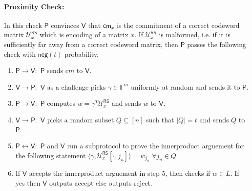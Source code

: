 \documentclass[runningheads]{llncs}
\newcommand{\innp}[2]{\langle #1,#2\rangle}
\def\prover{\mathsf{P}}
\def\verifier{\mathsf{V}}
\def\RS{\mathsf{RS}} %
\def\cm{\mathsf{cm}} %
\def\negl{\mathsf{neg}}
\def\calU{\mathcal{U}}
\def\bbF{\mathbb{F}}
\begin{document}
\paragraph{\textbf{Proximity Check:}} In this check $\prover$ convinces $\verifier$ that $\cm_x$ is the commitment of a correct codeword matrix $\calU^{\RS}_x$ which is encoding of a matrix $x$. If $\calU^{\RS}_x$ is malformed, i.e. if it is sufficiently far away from a correct codeword matrix, then $\prover$ passes the following check with $\negl(t)$ probability.
	\begin{enumerate}
		\item $\prover \rightarrow \verifier :$ $\prover$ sends $cm$ to $\verifier$.
		\item $\verifier \rightarrow \prover :$ $\verifier$ as a challenge picks $\gamma \in \bbF^m$ uniformly at random and sends it to $\prover$.
		\item $\prover \rightarrow \verifier :$ $\prover$ computes $w=\gamma^T\calU^{\RS}_x$ and sends $w$ to $\verifier$.
		\item $\verifier \rightarrow \prover :$ $\verifier$ picks a random subset $Q\subseteq [n]$ such that $|Q|=t$ and sends $Q$ to $\prover$.
		\item $\prover \leftrightarrow \verifier: $ $\prover$ and $\verifier$ run a subprotocol to prove the innerproduct arguement for the following statement $\innp{\gamma}{\calU^{\RS}_x[\cdot,j_u]}=w_{j_u}$ $\forall j_u\in Q$
		\item If $\verifier$ accepts the innerproduct arguement in step 5, then checks if $w\in L$. If yes then $\verifier$ outputs accept else outputs reject.
	\end{enumerate}
	
\end{document}
